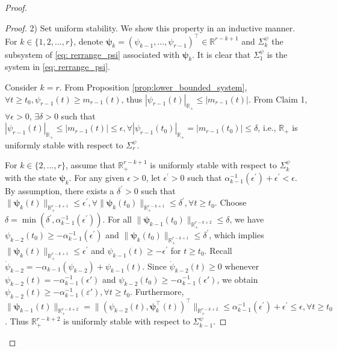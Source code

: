 \documentclass[letterpaper, 10 pt, journal, twoside]{IEEEtran}
\theoremstyle{plain}
\newcommand{\myvar}[1]{\bm{#1}}
\begin{document}
\begin{proof}
\begin{proof}
    2) Set uniform stability. We show this property in an inductive manner.  For $k\in  \{1,2,...,r\} $, denote $\myvar{\psi}_{k} = (\psi_{k-1}, ..., \psi_{r-1})^\top\in \mathbb{R}^{r-k+1}$ and  $\Sigma_k^{\psi}$ the subsystem of \eqref{eq: rerrange_psi} associated with $\myvar{\psi}_{k}$. It is clear that  $\Sigma_1^{\psi}$ is the system in \eqref{eq: rerrange_psi}. 
    
    Consider $k = r$.  From Proposition \ref{prop:lower_bounded_system}, $ \forall t \ge t_0, \psi_{r-1}(t) \geq m_{r-1}(t)$, thus $| \psi_{r-1}(t)|_{\mathbb{R}_+} \leq |m_{r-1}(t)|$. From Claim 1, $ \forall \epsilon>0$, $\exists \delta>0$ such that $ |\psi_{r-1}(t)|_{\mathbb{R}_{+}} \leq |m_{r-1}(t)|\leq \epsilon, \forall  |\psi_{r-1}(t_0)|_{\mathbb{R}_{+}} =  |m_{r-1}(t_0)|\leq \delta$, i.e., $\mathbb{R}_{+}$ is uniformly stable with respect to $\Sigma_r^{\psi}$.
    
    For $k \in \{2,...,r\}$, assume that $\mathbb{R}_{+}^{r-k+1}$ is uniformly stable  with respect to $\Sigma_{k}^{\psi}$ with the state $\myvar{\psi}_{k}$. For any given $\epsilon>0$, let $\epsilon^\prime >0$ such that $\alpha_{k-1}^{-1}(\epsilon^\prime) + \epsilon^\prime < \epsilon$. By assumption, there exists a $\delta^{\prime} >0$ such that  $  \| \myvar{\psi}_{k} (t)\|_{\mathbb{R}_{+}^{r-k+1}} \leq \epsilon^\prime, \forall \| \myvar{\psi}_{k} (t_0)\|_{\mathbb{R}_{+}^{r-k+1}} \leq \delta^{\prime}, \forall t\ge t_0$. Choose $\delta = \min(\delta^\prime,\alpha_{k-1}^{-1}(\epsilon^\prime))$.  For all $\| \myvar{\psi}_{k-1} (t_0) \|_{\mathbb{R}_{+}^{r-k+2}} \leq  \delta$,  we have $\psi_{k-2}(t_0) \ge - \alpha_{k-1}^{-1}(\epsilon^\prime)$ and $\| \myvar{\psi}_{k} (t_0) \|_{\mathbb{R}_{+}^{r-k+1}} \leq   \delta^{\prime}$, which implies $\| \myvar{\psi}_{k} (t) \|_{\mathbb{R}_{+}^{r-k+1}} \leq   \epsilon^{\prime}$ and $\psi_{k-1}(t) \ge  - \epsilon^\prime$ for $t\ge t_0$. Recall $\dot{\psi}_{k-2} = -\alpha_{k-1}(\psi_{k-2}) + \psi_{k-1}(t)$.  Since  $\dot{\psi}_{k-2}(t) \geq 0$ whenever $\psi_{k-2}(t) = - \alpha_{k-1}^{-1}(\epsilon')$ and $\psi_{k-2}(t_0) \geq - \alpha_{k-1}^{-1}(\epsilon')$, we obtain $\psi_{k-2}(t) \geq - \alpha_{k-1}^{-1}(\varepsilon'), \forall t \geq t_0$. Furthermore,  $ \| \myvar{\psi}_{k-1}(t) \|_{\mathbb{R}_{+}^{r-k+2}} = \| (\psi_{k-2}(t), \myvar{\psi}_{k}^\top(t))^\top \|_{\mathbb{R}_{+}^{r-k+2}} \leq \alpha_{k-1}^{-1}(\epsilon^\prime) + \epsilon^\prime \leq \epsilon, \forall t\ge t_0$. Thus  $\mathbb{R}_{+}^{r-k+2}$ is uniformly stable with respect to $\Sigma_{k-1}^{\psi}$. 
    

\end{proof}
\end{proof}
\end{document}
